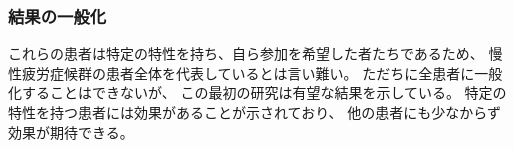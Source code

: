 
\begin{frame}
\frametitle{結果の一般化}


これらの患者は特定の特性を持ち、自ら参加を希望した者たちであるため、
慢性疲労症候群の患者全体を代表しているとは言い難い。
ただちに全患者に一般化することはできないが、
この最初の研究は有望な結果を示している。
特定の特性を持つ患者には効果があることが示されており、
他の患者にも少なからず効果が期待できる。

\end{frame}

